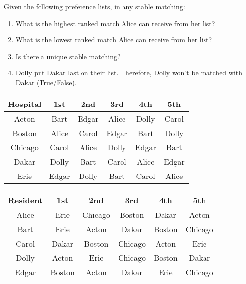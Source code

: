 \begin{Exercise} Given the following preference lists, in any stable matching:\\
    \begin{enumerate}
        \item What is the highest ranked match Alice can receive from her list?
        \item What is the lowest ranked match Alice can receive from her list?
        \item Is there a unique stable matching?
        \item Dolly put Dakar last on their list. Therefore, Dolly won't be matched with Dakar (True/False).
    \end{enumerate}
   
    \vspace{1em}
    \begin{tabular}{|c|c|c|c|c|c|}
        \hline
        \rowcolor{OliveGreen!10}\textbf{Hospital} & \textbf{1st} & \textbf{2nd} & \textbf{3rd} & \textbf{4th} & \textbf{5th} \\ \hline
        Acton & Bart & Edgar & Alice & Dolly & Carol \\ \hline
        Boston & Alice & Carol & Edgar & Bart & Dolly \\ \hline
        Chicago & Carol & Alice & Dolly & Edgar & Bart \\ \hline
        Dakar & Dolly & Bart & Carol & Alice & Edgar \\ \hline
        Erie & Edgar & Dolly & Bart & Carol & Alice \\ \hline
    \end{tabular}
    

    \vspace{1em}
    \begin{tabular}{|c|c|c|c|c|c|}
        \hline
        \rowcolor{OliveGreen!10}\textbf{Resident} & \textbf{1st} & \textbf{2nd} & \textbf{3rd} & \textbf{4th} & \textbf{5th} \\ \hline
        Alice & Erie & Chicago & Boston & Dakar & Acton \\ \hline
        Bart & Erie & Acton & Dakar & Boston & Chicago \\ \hline
        Carol & Dakar & Boston & Chicago & Acton & Erie \\ \hline
        Dolly & Acton & Erie & Chicago & Boston & Dakar \\ \hline
        Edgar & Boston & Acton & Dakar & Erie & Chicago \\ \hline
    \end{tabular}
\end{Exercise}

